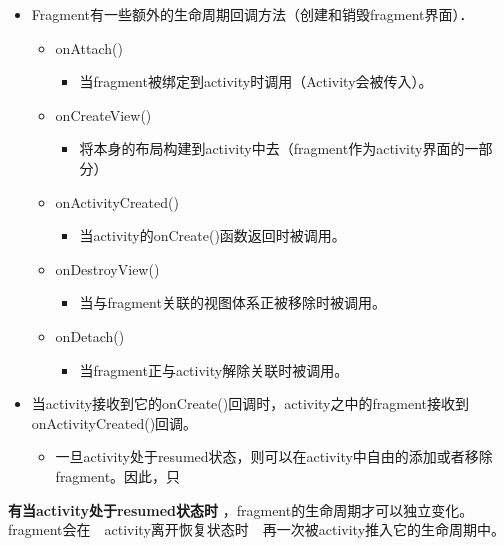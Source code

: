 \documentclass[9pt, b5paper]{article}
\begin{document}
\begin{itemize}
\item Fragment有一些额外的生命周期回调方法（创建和销毁fragment界面）．
\begin{itemize}
\item onAttach()
\begin{itemize}
\item 当fragment被绑定到activity时调用（Activity会被传入）。
\end{itemize}
\item onCreateView()
\begin{itemize}
\item 将本身的布局构建到activity中去（fragment作为activity界面的一部分）
\end{itemize}
\item onActivityCreated()
\begin{itemize}
\item 当activity的onCreate()函数返回时被调用。
\end{itemize}
\item onDestroyView()
\begin{itemize}
\item 当与fragment关联的视图体系正被移除时被调用。
\end{itemize}
\item onDetach()
\begin{itemize}
\item 当fragment正与activity解除关联时被调用。
\end{itemize}
\end{itemize}
\item 当activity接收到它的onCreate()回调时，activity之中的fragment接收到onActivityCreated()回调。
\begin{itemize}
\item 一旦activity处于resumed状态，则可以在activity中自由的添加或者移除fragment。因此，只
\end{itemize}
\end{itemize}
\textbf{有当activity处于resumed状态时} ，fragment的生命周期才可以独立变化。fragment会在　activity离开恢复状态时　再一次被activity推入它的生命周期中。
\end{document}
